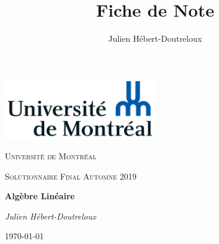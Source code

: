 \documentclass{article}[french, babel]
\author{Julien Hébert-Doutreloux}
\title{Fiche de Note}
\begin{document}
		\begin{titlepage}
		\centering
		\includegraphics[width=0.5\textwidth]{Universite_de_Montreal_logo}\par\vspace{1cm}
		{\scshape\LARGE Université de Montréal\par}
		\vspace{1cm}
		{\scshape\Large Solutionnaire Final Automne 2019\par}
		\vspace{1.5cm}
		{\huge\bfseries Algèbre Linéaire\par}
		\vspace{2cm}
		{\Large\itshape Julien Hébert-Doutreloux\par}
		\vfill
		\vfill
		{\large \today\par}
	\end{titlepage}
\setcounter{subsection}{0}
\setcounter{subsection}{0}
\setcounter{subsection}{0}
\setcounter{subsection}{0}
\end{document}
